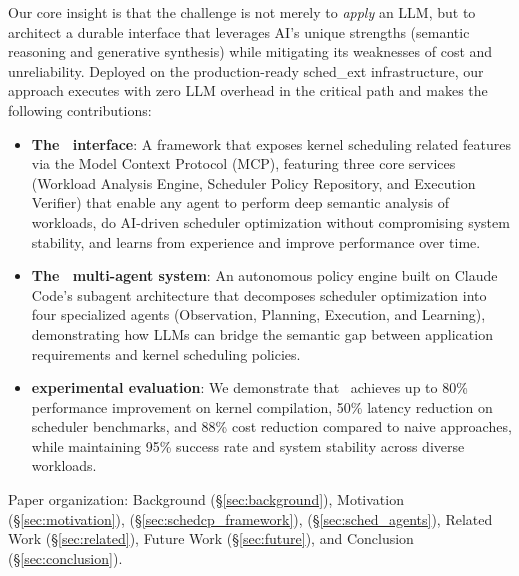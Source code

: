 Our core insight is that the challenge is not merely to \emph{apply} an LLM, but to architect a durable interface that leverages AI's unique strengths (semantic reasoning and generative synthesis) while mitigating its weaknesses of cost and unreliability. Deployed on the production-ready sched\_ext infrastructure, our approach executes with zero LLM overhead in the critical path and makes the following contributions:

\begin{itemize}
    \item \textbf{The \sys\ interface}: A framework that exposes kernel scheduling related features via the Model Context Protocol (MCP), featuring three core services (Workload Analysis Engine, Scheduler Policy Repository, and Execution Verifier) that enable any agent to perform deep semantic analysis of workloads, do AI-driven scheduler optimization without compromising system stability, and learns from experience and improve performance over time.
    \item \textbf{The \agent\ multi-agent system}: An autonomous policy engine built on Claude Code's subagent architecture that decomposes scheduler optimization into four specialized agents (Observation, Planning, Execution, and Learning), demonstrating how LLMs can bridge the semantic gap between application requirements and kernel scheduling policies.
    \item \textbf{experimental evaluation}: We demonstrate that \agent\ achieves up to 80\% performance improvement on kernel compilation, 50\% latency reduction on scheduler benchmarks, and 88\% cost reduction compared to naive approaches, while maintaining 95\% success rate and system stability across diverse workloads.
\end{itemize}

Paper organization: Background (§\ref{sec:background}), Motivation (§\ref{sec:motivation}),  \sys (§\ref{sec:schedcp_framework}), \agent (§\ref{sec:sched_agents}), Related Work (§\ref{sec:related}), Future Work (§\ref{sec:future}), and Conclusion (§\ref{sec:conclusion}).


